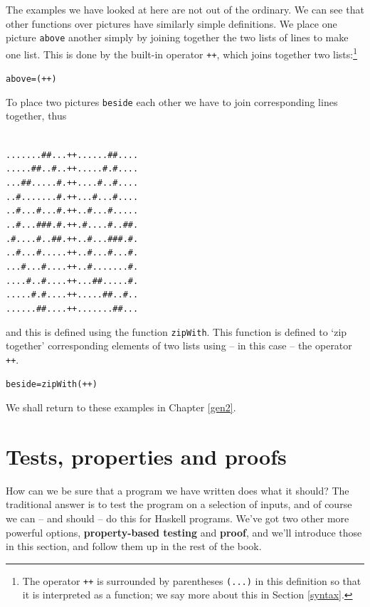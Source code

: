 The examples we have looked at here are not out of the ordinary. We can see that
other functions over pictures have similarly simple definitions. We
place one picture \texttt{above} another simply by joining together the two 
lists of lines to make one list. This is done by the built-in operator
\texttt{++}\minx{++},
which joins together two lists:\footnote{The operator \texttt{++} is
surrounded by parentheses \texttt{(...)} in this definition so that it
is interpreted as a function; we say more about this in 
Section \ref{syntax}.}
\begin{alltt}
above = (++)
\end{alltt}

To place two pictures \texttt{beside} each other we have to join corresponding
lines together, thus
\begin{alltt}\label{beside}
.......##...   ++   ......##....
.....##..#..   ++   .....#.#....
...##.....#.   ++   ....#..#.... 
..#.......#.   ++   ...#...#.... 
..#...#...#.   ++   ..#...#.....
..#...###.#.   ++   .#....#..##.    
.#....#..##.   ++   ..#...###.#.    
..#...#.....   ++   ..#...#...#.     
...#...#....   ++   ..#.......#.     
....#..#....   ++   ...##.....#.      
.....#.#....   ++   .....##..#..      
......##....   ++   .......##...         
\end{alltt}
and this is defined using the function \texttt{zipWith}. This function is
defined to `zip together' corresponding elements of two lists
using -- in this case -- the operator \texttt{++}.
\begin{alltt}
beside = zipWith (++) 
\end{alltt}
We shall return to these examples in Chapter \ref{gen2}.


\section{Tests, properties and proofs}
\label{proof}\label{pictureProps}



\noindent
How can we be sure that a program we have written does what it should? The traditional answer is to test the program on a selection of inputs, and of course we can -- and should -- do this for Haskell programs. We've got two other more powerful options, \textbf{property-based testing} and \textbf{proof}, and we'll introduce those in this section, and follow them up in the rest of the book. 

